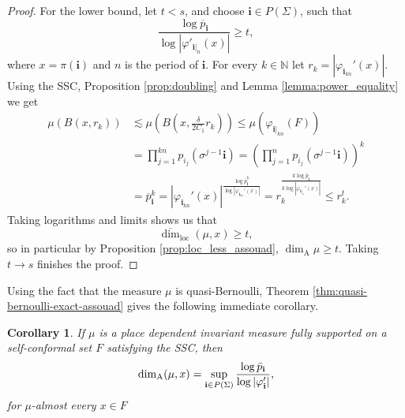 \documentclass{PRM}
\newcommand{\field}[1]{\mathbb{#1}}
\newcommand{\N}{\field{N}}
\newcommand{\updim}{\overline{\dim}}
\theoremstyle{plain}
\newtheorem{cor}[thm]{Corollary}
\theoremstyle{definition}
\theoremstyle{remark}
\begin{document}
\begin{proof}
For the lower bound, let $t<s$, and choose $\mathbf{i}\in P(\Sigma)$, such that
\begin{equation*}
    \frac{\log \overline{p}_{\mathbf{i}}}{\log |\varphi'_{\mathbf{i}|_{n}}(x)|}\geq t,
\end{equation*}
where $x=\pi(\mathbf{i})$ and $n$ is the period of $\mathbf{i}$. For every $k\in\N$ let $r_k=|\varphi_{\mathbf{i}_{kn}}'(x)|$. Using the SSC, Proposition \ref{prop:doubling} and Lemma \ref{lemma:power_equality} we get
\begin{align*}
    \mu(B(x,r_k))&\lesssim\mu(B(x,\tfrac{\delta}{2C_1}r_k))\leq \mu(\varphi_{\mathbf{i}|_{kn}}(F))\\
    &=\prod_{j=1}^{kn}p_{i_j}(\sigma^{j-1}\mathbf{i})=\left(\prod_{j=1}^{n}p_{i_j}(\sigma^{j-1}\mathbf{i})\right)^k\\
    &=\overline{p}_{\mathbf{i}}^k=|\varphi_{\mathbf{i}_{kn}}'(x)|^\frac{\log \overline{p}_{\mathbf{i}}^k}{\log |\varphi_{\mathbf{i}_{kn}}'(x)|}=r_k^\frac{k\log \overline{p}_{\mathbf{i}}}{k\log |\varphi_{\mathbf{i}|_{n}}'(x)|}\leq r_k^t.
\end{align*}
Taking logarithms and limits shows us that
\begin{equation*}
    \updim_{\text{loc}}(\mu,x)\geq t,
\end{equation*}
so in particular by Proposition \ref{prop:loc_less_assouad},  $\dim_{\mathrm{A}}\mu\geq t$. Taking $t\to s$ finishes the proof.
\end{proof}
Using the fact that the measure $\mu$ is quasi-Bernoulli, Theorem \ref{thm:quasi-bernoulli-exact-assouad} gives the following immediate corollary.
\begin{cor}\label{cor:invmeas-pw}
If $\mu$ is a place dependent invariant measure fully supported on a self-conformal set $F$ satisfying the SSC, then
\begin{equation*}
    \dim_{\mathrm{A}}(\mu,x)=\sup_{\mathbf{i}\in P(\Sigma)}\frac{\log \Bar{p}_{\mathbf{i}}}{\log|\varphi'_{\mathbf{i}}|},
\end{equation*}
for $\mu$-almost every $x\in F$
\end{cor}
\end{document}
